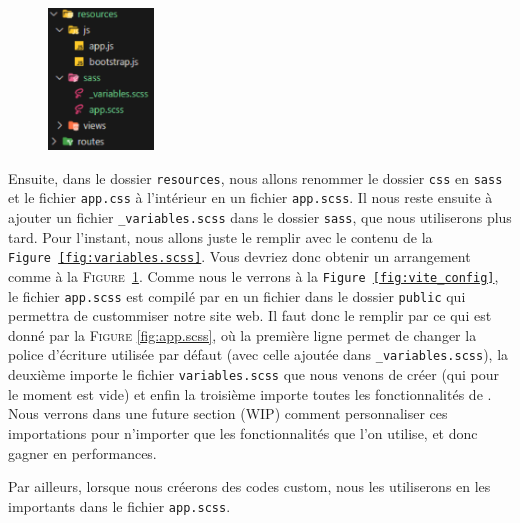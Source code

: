 \begin{figure}
    \vspace{-0.5cm}
    \includegraphics[width=0.25\textwidth]{figures-C1/bs_setup.pdf}
    \caption{\label{fig:bs_setup}}
\end{figure}
Ensuite, dans le dossier \verb|resources|, nous allons renommer le dossier \verb|css| en \verb|sass| et le fichier \verb|app.css| à l'intérieur en un fichier \verb|app.scss|. Il nous reste ensuite à ajouter un fichier \verb|_variables.scss| dans le dossier \verb|sass|, que nous utiliserons plus tard. Pour l'instant, nous allons juste le remplir avec le contenu de la \texttt{Figure~\ref{fig:variables.scss}}. Vous devriez donc obtenir un arrangement comme à la \textsc{Figure~\ref{fig:bs_setup}}. Comme nous le verrons à la \texttt{Figure~\ref{fig:vite_config}}, le fichier \verb|app.scss| est compilé par \vite{} en un fichier \css{} dans le dossier \verb|public| qui permettra de custommiser notre site web. Il faut donc le remplir par ce qui est donné par la \textsc{Figure }\ref{fig:app.scss}, où la première ligne permet de changer la police d'écriture utilisée par défaut (avec celle ajoutée dans \verb|_variables.scss|), la deuxième importe le fichier \verb|variables.scss| que nous venons de créer (qui pour le moment est vide) et enfin la troisième importe toutes les fonctionnalités de \bs{}. Nous verrons dans une future section (WIP) comment personnaliser ces importations pour n'importer que les fonctionnalités que l'on utilise, et donc gagner en performances. 

Par ailleurs, lorsque nous créerons des codes \sass{} custom, nous les utiliserons en les importants dans le fichier \verb|app.scss|.

